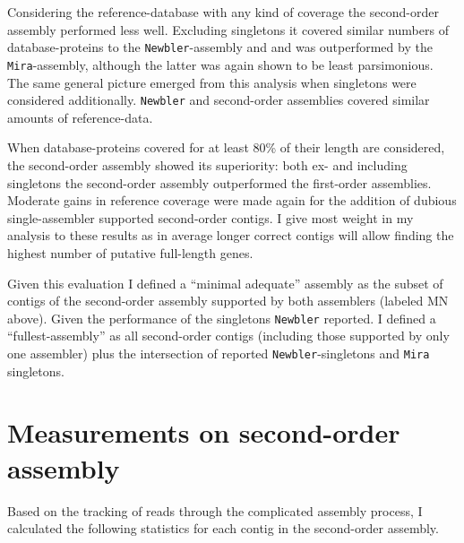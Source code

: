 
Considering the reference-database with any kind of coverage the
second-order assembly performed less well. Excluding singletons it
covered similar numbers of database-proteins to the
\texttt{Newbler}-assembly and and was outperformed by the
\texttt{Mira}-assembly, although the latter was again shown to be
least parsimonious. The same general picture emerged from this
analysis when singletons were considered
additionally. \texttt{Newbler} and second-order assemblies covered
similar amounts of reference-data.


When database-proteins covered for at least 80\% of their length are
considered, the second-order assembly showed its superiority: both ex-
and including singletons the second-order assembly outperformed the
first-order assemblies. Moderate gains in reference coverage were made
again for the addition of dubious single-assembler supported
second-order contigs. I give most weight in my analysis to these
results as in average longer correct contigs will allow finding the
highest number of putative full-length genes.

Given this evaluation I defined a ``minimal adequate'' assembly as the
subset of contigs of the second-order assembly supported by both
assemblers (labeled MN above). Given the performance of the singletons
\texttt{Newbler} reported. I defined a ``fullest-assembly'' as all
second-order contigs (including those supported by only one assembler)
plus the intersection of reported \texttt{Newbler}-singletons and
\texttt{Mira} singletons.

\section{Measurements on second-order assembly}

Based on the tracking of reads through the complicated assembly
process, I calculated the following statistics for each contig in the
second-order assembly.

